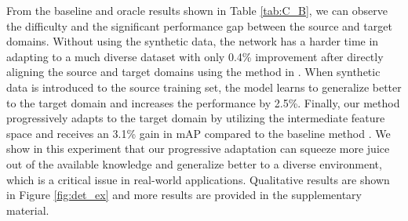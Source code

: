 \documentclass[10pt,twocolumn,letterpaper]{article}
\begin{document}
From the baseline and oracle results shown in Table \ref{tab:C_B}, we can observe the difficulty and the significant performance gap between the source and target domains.
Without using the synthetic data, the network has a harder time in adapting to a much diverse dataset with only 0.4\% improvement after directly aligning the source and target domains using the method in \cite{chen2018domain}.
When synthetic data is introduced to the source training set, the model learns to generalize better to the target domain and increases the performance by 2.5\%.
Finally, our method progressively adapts to the target domain by utilizing the intermediate feature space and receives an 3.1\% gain in mAP compared to the baseline method \cite{chen2018domain}.
We show in this experiment that our progressive adaptation can squeeze more juice out of the available knowledge and generalize better to a diverse environment, which is a critical issue in real-world applications.
Qualitative results are shown in Figure \ref{fig:det_ex} and more results are provided in the supplementary material.
\end{document}
